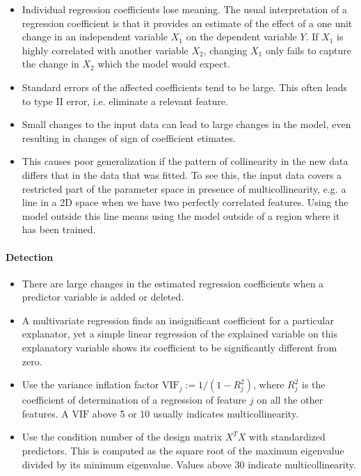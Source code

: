 \documentclass[]{article}
\begin{document}
\begin{itemize}
\item Individual regression coefficients lose meaning. The usual interpretation of a regression coefficient is that it provides an estimate of the effect of a one unit change in an independent variable $X_1$ on the dependent variable $Y$. If $X_1$ is highly correlated with another variable $X_2$, changing $X_1$ only fails to capture the change in $X_2$ which the model would expect.
\item Standard errors of the affected coefficients tend to be large. This often leads to type II error, i.e. eliminate a relevant feature.
\item Small changes to the input data can lead to large changes in the model, even resulting in changes of sign of coefficient etimates.
\item This causes poor generalization if the pattern of collinearity in the new data differs that in the data that was fitted. To see this, the input data covers a restricted part of the parameter space in presence of multicollinearity, e.g. a line in a 2D space when we have two perfectly correlated features. Using the model outside this line means using the model outside of a region where it has been trained.
\end{itemize}

\paragraph{Detection}

\begin{itemize}
\item There are large changes in the estimated regression coefficients when a predictor variable is added or deleted.
\item A multivariate regression finds an insignificant coefficient for a particular explanator, yet a simple linear regression of the explained variable on this explanatory variable shows its coefficient to be significantly different from zero.
\item Use the variance inflation factor $\mathrm{VIF}_j:=1/(1-R_j^2)$, where $R_j^2$ is the coefficient of determination of a regression of feature $j$ on all the other features. A $\mathrm{VIF}$ above 5 or 10 usually indicates multicollinearity.
\item Use the condition number of the design matrix $X^TX$ with standardized predictors. This is computed as the square root of the maximum eigenvalue divided by its minimum eigenvalue. Values above 30 indicate multicollinearity.
\end{itemize}
\end{document}
